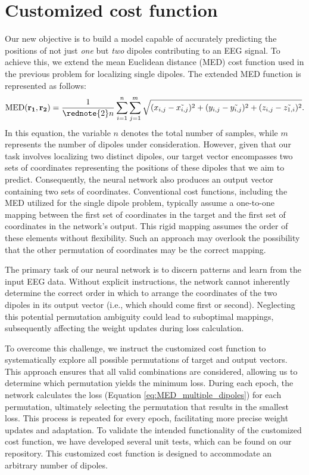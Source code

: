 \documentclass[a4paper, UKenglish, 11pt]{uiomaster}
\begin{document}
\section{Customized cost function}
Our new objective is to build a model capable of accurately predicting the positions of not just \emph{one} but \emph{two} dipoles contributing to an EEG signal. To achieve this, we extend the mean Euclidean distance (MED) cost function used in the previous problem for localizing single dipoles. The extended MED function is represented as follows:
\begin{equation}
\begin{aligned}
    \text{MED}(\mathbf{r_1}, \mathbf{r_2}) = \frac{1}{\rednote{2}n}\sum_{i=1}^{n}\sum_{j=1}^{m} \sqrt{(x_{i,j} - \tilde{x_{i,j}})^2 + (y_{i,j} - \tilde{y_{i,j}})^2 + (z_{i,j} - \tilde{z_{1,i}})^2}.
\end{aligned}
\label{eq:MED_multiple_dipoles}
\end{equation}
In this equation, the variable $n$ denotes the total number of samples, while $m$ represents the number of dipoles under consideration. However, given that our task involves localizing two distinct dipoles, our target vector encompasses two sets of coordinates representing the positions of these dipoles that we aim to predict. Consequently, the neural network also produces an output vector containing two sets of coordinates. Conventional cost functions, including the MED utilized for the single dipole problem, typically assume a one-to-one mapping between the first set of coordinates in the target and the first set of coordinates in the network's output. This rigid mapping assumes the order of these elements without flexibility. Such an approach may overlook the possibility that the other permutation of coordinates may be the correct mapping.

The primary task of our neural network is to discern patterns and learn from the input EEG data. Without explicit instructions, the network cannot inherently determine the correct order in which to arrange the coordinates of the two dipoles in its output vector (i.e., which should come first or second). Neglecting this potential permutation ambiguity could lead to suboptimal mappings, subsequently affecting the weight updates during loss calculation.

To overcome this challenge, we instruct the customized cost function to systematically explore all possible permutations of target and output vectors. This approach ensures that all valid combinations are considered, allowing us to determine which permutation yields the minimum loss. During each epoch, the network calculates the loss (Equation \ref{eq:MED_multiple_dipoles}) for each permutation, ultimately selecting the permutation that results in the smallest loss. This process is repeated for every epoch, facilitating more precise weight updates and adaptation. To validate the intended functionality of the customized cost function, we have developed several unit tests, which can be found on our  repository. This customized cost function is designed to accommodate an arbitrary number of dipoles.
\end{document}
